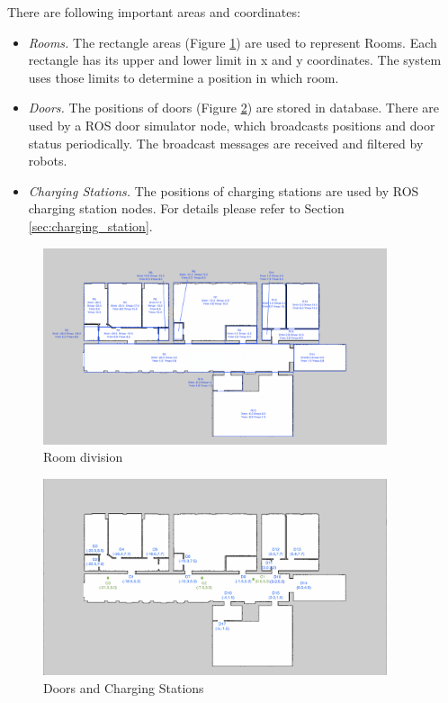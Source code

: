 There are following important areas and coordinates:
\begin{itemize}
	\item \textsl{Rooms.} The rectangle areas (Figure \ref{fig:room_division}) are used to represent Rooms. Each rectangle has its upper and lower limit in x and y coordinates. The system uses those limits to determine a position in which room. 
	\item \textsl{Doors.} The positions of doors (Figure \ref{fig:positions_door_station}) are stored in database. There are used by a ROS door simulator node, which broadcasts positions and door status periodically. The broadcast messages are received and filtered by robots.
	\item \textsl{Charging Stations.} The positions of charging stations are used by ROS charging station nodes. For details please refer to Section \ref{sec:charging_station}.
\end{itemize}

\begin{figure}[htbp]
	\centering
	\includegraphics[width = 0.9\textwidth]{content/images/ch3/room_division.png}
	\caption{Room division}
	\label{fig:room_division}
\end{figure}

\begin{figure}[htbp]
	\centering
	\includegraphics[width = 0.9\textwidth]{content/images/ch3/positions_door_station.png}
	\caption{Doors and Charging Stations}
	\label{fig:positions_door_station}
\end{figure}

